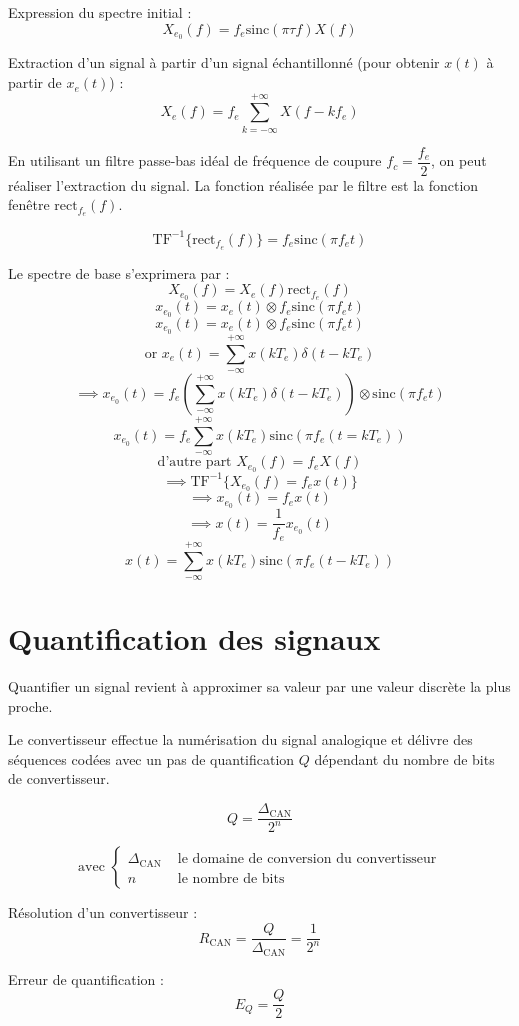 \documentclass[a4paper,12pt]{article}
\begin{document}
Expression du spectre initial :
\[ X_{e_0}(f) = f_e \mathrm{sinc}(\pi \tau f) X(f) \]

Extraction d'un signal à partir d'un signal échantillonné (pour obtenir $x(t)$ à partir de $x_e(t)$) :
\[ X_e(f) = f_e \sum_{k=-\infty}^{+\infty} X(f-kf_e) \]

En utilisant un filtre passe-bas idéal de fréquence de coupure $f_c = \dfrac{f_e}{2}$, on peut réaliser l'extraction du signal. La fonction réalisée par le filtre est la fonction fenêtre $\mathrm{rect}_{f_e}(f)$.

\begin{defi}
    \[ \mathrm{TF}^{-1} \{ \mathrm{rect}_{f_e}(f) \} = f_e \mathrm{sinc}(\pi f_e t) \]
\end{defi}

Le spectre de base s'exprimera par :
\[ X_{e_0}(f) = X_e(f) \mathrm{rect}_{f_e}(f) \]
\[ x_{e_0}(t) = x_e(t) \otimes f_e \mathrm{sinc}(\pi f_et) \]
\[ x_{e_0}(t) = x_e(t) \otimes f_e \mathrm{sinc}(\pi f_e t) \]
\[ \text{or } x_e(t) = \sum_{-\infty}^{+\infty} x(kT_e) \delta(t-kT_e) \]
\[ \implies x_{e_0}(t) = f_e (\sum_{-\infty}^{+\infty} x(kT_e) \delta(t-kT_e)) \otimes \mathrm{sinc}(\pi f_e t) \]
\[ x_{e_0}(t) = f_e \sum_{-\infty}^{+\infty} x(kT_e) \mathrm{sinc}(\pi f_e (t=kT_e)) \]
\[ \text{d'autre part } X_{e_0}(f) = f_e X(f) \]
\[ \implies \mathrm{TF}^{-1} \{ X_{e_0}(f) = f_e x(t) \} \]
\[ \implies x_{e_0}(t) = f_e x(t) \]
\[ \implies x(t) = \dfrac{1}{f_e} x_{e_0}(t) \]
\[ x(t) = \sum_{-\infty}^{+\infty} x(kT_e) \mathrm{sinc}(\pi f_e (t-kT_e)) \]

\section{Quantification des signaux}

Quantifier un signal revient à approximer sa valeur par une valeur discrète la plus proche.

\begin{defi}
    Le convertisseur effectue la numérisation du signal analogique et délivre des séquences codées avec un pas de quantification $Q$ dépendant du nombre de bits de convertisseur.

    \[ Q = \dfrac{\Delta_{\mathrm{CAN}}}{2^n} \]

    \[ \text{avec } \begin{cases}
        \Delta_{\mathrm{CAN}} & \text{ le domaine de conversion du convertisseur} \\
        n & \text{ le nombre de bits}
    \end{cases} \]

    Résolution d'un convertisseur :
    \[ R_\mathrm{CAN} = \dfrac{Q}{\Delta_\mathrm{CAN}} = \dfrac{1}{2^n} \]

    Erreur de quantification :
    \[ E_Q = \dfrac{Q}{2} \]
\end{defi}
\end{document}
